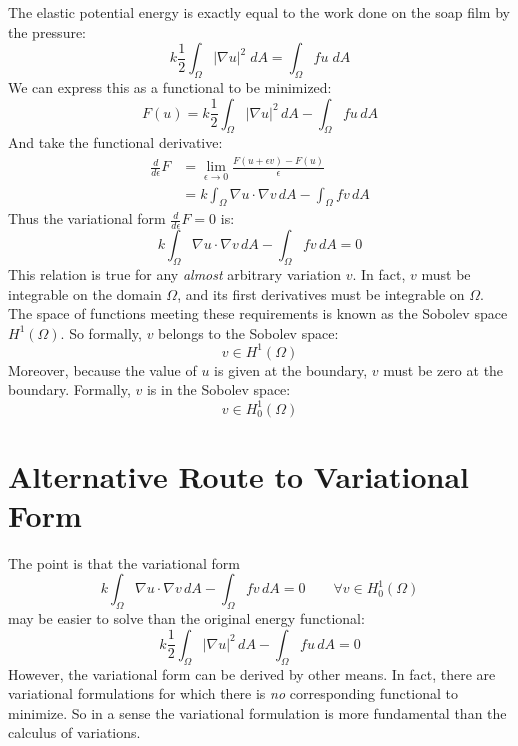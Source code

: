 \documentclass[12pt, a4paper, twoside, openright]{book}
\begin{document}
The elastic potential energy is exactly equal to the work done on the soap film by the pressure:
\begin{equation}
k \frac{1}{2} \int_{\Omega} |\nabla u|^2 \;dA = \int_{\Omega} f u \;dA
\end{equation}
We can express this as a functional to be minimized:
\begin{equation}
F(u) =  k \frac{1}{2} \int_{\Omega} |\nabla u|^2 \,dA - \int_{\Omega} f u \,dA
\end{equation}
And take the functional derivative:                  
\begin{align}
\frac{d}{d\epsilon}F & = \lim_{\epsilon \rightarrow 0}
                         \frac{F(u + \epsilon v) - F(u)}{\epsilon} \\
  & =
    k \int_{\Omega} \nabla u \cdot \nabla v \,dA
        - \int_{\Omega} f v \,dA     
\end{align}
Thus the variational form $\frac{d}{d\epsilon}F = 0$ is:
\begin{equation}
k \int_{\Omega} \nabla u \cdot \nabla v \,dA
        - \int_{\Omega} f v \,dA = 0
\end{equation}
This relation is true for any \emph{almost} arbitrary variation $v$.  In fact, $v$ must be integrable on the domain $\Omega$, and its first derivatives must be integrable on $\Omega$.
The space of functions meeting these requirements is known as the Sobolev space $H^1(\Omega) $.  So formally, $v$ belongs to the Sobolev space:
\begin{equation}
v \in H^1 (\Omega)
\end{equation}
Moreover, because the value of $u$ is given at the boundary, $v$ must be zero at the boundary.  Formally, $v$ is in the Sobolev space:
\begin{equation}
v \in H_0^1 (\Omega)
\end{equation}

\section{Alternative Route to Variational Form}

The point is that the variational form
\begin{equation}
k \int_{\Omega} \nabla u \cdot \nabla v \,dA  - \int_{\Omega} f v \,dA = 0
\qquad
\forall v \in H_0^1(\Omega)
\end{equation}
may be easier to solve than the original energy functional:
\begin{equation}
k \frac{1}{2} \int_{\Omega} |\nabla u|^2 \,dA - \int_{\Omega} f u \,dA = 0
\end{equation}
However, the variational form can be derived by other means.  In fact, there are variational formulations for which there is \emph{no} corresponding functional to minimize.  So in a sense the variational formulation is more fundamental than the calculus of variations.
\end{document}
